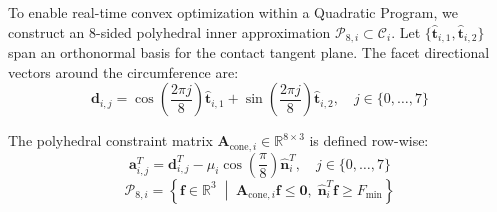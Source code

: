 To enable real-time convex optimization within a Quadratic Program, we construct an 8-sided polyhedral inner approximation $\mathcal{P}_{8, i} \subset \mathcal{C}_i$. Let $\{\hat{\mathbf{t}}_{i, 1}, \hat{\mathbf{t}}_{i, 2}\}$ span an orthonormal basis for the contact tangent plane. The facet directional vectors around the circumference are:
\begin{equation}
    \mathbf{d}_{i, j} = \cos\left( \frac{2\pi j}{8} \right) \hat{\mathbf{t}}_{i, 1} + \sin\left( \frac{2\pi j}{8} \right) \hat{\mathbf{t}}_{i, 2}, \quad j \in \{0, \dots, 7\}
\end{equation}

The polyhedral constraint matrix $\mathbf{A}_{\text{cone}, i} \in \mathbb{R}^{8 \times 3}$ is defined row-wise:
\begin{equation}
    \mathbf{a}_{i, j}^T = \mathbf{d}_{i, j}^T - \mu_i \cos\left(\frac{\pi}{8}\right) \hat{\mathbf{n}}_i^T, \quad j \in \{0, \dots, 7\}
    \label{eq:cone_rows}
\end{equation}
\begin{equation}
    \mathcal{P}_{8, i} = \left\{ \mathbf{f} \in \mathbb{R}^3 \;\middle|\; \mathbf{A}_{\text{cone}, i} \mathbf{f} \le \mathbf{0}, \; \hat{\mathbf{n}}_i^T \mathbf{f} \ge F_{\min} \right\}
\end{equation}

